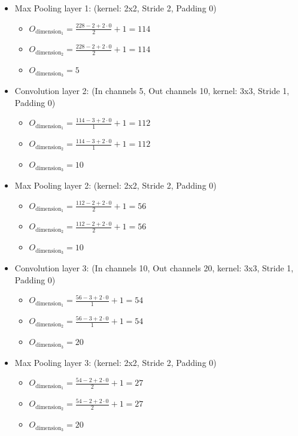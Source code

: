 \documentclass[12pt]{article}
\begin{document}
\begin{enumerate}
\begin{enumerate}
\begin{itemize}
    \item Max Pooling layer 1: (kernel: 2x2, Stride 2, Padding 0)\\ 
      \begin{itemize}
        \item $O_{\text{dimension}_1} = \frac{228 - 2 + 2 \cdot 0}{2} + 1 = 114$ 
        \item $O_{\text{dimension}_2} = \frac{228 - 2 + 2 \cdot 0}{2} + 1 = 114$ 
        \item $O_{\text{dimension}_3} = 5$ 
      \end{itemize}
    \item Convolution layer 2: (In channels 5, Out channels 10, kernel: 3x3, Stride 1, Padding 0)
      \begin{itemize}
        \item $O_{\text{dimension}_1} = \frac{114 - 3 + 2 \cdot 0}{1} + 1 = 112$ 
        \item $O_{\text{dimension}_2} = \frac{114 - 3 + 2 \cdot 0}{1} + 1 = 112$ 
        \item $O_{\text{dimension}_3} = 10$ 
      \end{itemize}
    \item Max Pooling layer 2: (kernel: 2x2, Stride 2, Padding 0)
      \begin{itemize}
        \item $O_{\text{dimension}_1} = \frac{112 - 2 + 2 \cdot 0}{2} + 1 = 56$ 
        \item $O_{\text{dimension}_2} = \frac{112 - 2 + 2 \cdot 0}{2} + 1 = 56$ 
        \item $O_{\text{dimension}_3} = 10$ 
      \end{itemize}
    \item Convolution layer 3: (In channels 10, Out channels 20, kernel: 3x3, Stride 1, Padding 0)
      \begin{itemize}
        \item $O_{\text{dimension}_1} = \frac{56 - 3 + 2 \cdot 0}{1} + 1 = 54$ 
        \item $O_{\text{dimension}_2} = \frac{56 - 3 + 2 \cdot 0}{1} + 1 = 54$ 
        \item $O_{\text{dimension}_3} = 20$ 
      \end{itemize}
    \item Max Pooling layer 3: (kernel: 2x2, Stride 2, Padding 0)
      \begin{itemize}
        \item $O_{\text{dimension}_1} = \frac{54 - 2 + 2 \cdot 0}{2} + 1 = 27$ 
        \item $O_{\text{dimension}_2} = \frac{54 - 2 + 2 \cdot 0}{2} + 1 = 27$ 
        \item $O_{\text{dimension}_3} = 20$ 
      \end{itemize}
  \end{itemize}


\end{enumerate}
\end{enumerate}
\end{document}
